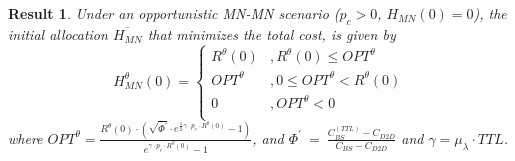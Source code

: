 \documentclass[10pt,conference,letterpaper]{IEEEtran}
\newtheorem{result}{Result}
\begin{document}
\begin{result}\label{THM:OPTIMAL-H0-MN-MN}
Under an \textit{opportunistic MN-MN scenario} ($p_{c}>0$, $H_{MN}(0)=0$), the initial allocation $\overline{H_{MN}}$ that minimizes the total cost, is given by
\begin{equation*}
 H_{MN}^{\theta}(0) = \left\{
 \begin{array}{lc}
  R^{\theta}(0)& ,  R^{\theta}(0)\leq  OPT^{\theta}\\
 OPT^{\theta} & , 0\leq OPT^{\theta}< R^{\theta}(0)\\
  0		& , OPT^{\theta}< 0\\
 \end{array}
 \right.
 \end{equation*}
where $\displaystyle{OPT^{\theta} =\frac{R^{\theta}(0)\cdot \left(\sqrt{\Phi^{'}}\cdot e^{\frac{1}{2}\gamma\cdot p_{c}\cdot R^{\theta}(0)}-1\right)}{e^{\gamma\cdot p_{c}\cdot R^{\theta}(0)}-1}}$, and $\Phi^{'}~=~\frac{C_{BS}^{(TTL)}-C_{D2D}}{C_{BS}-C_{D2D}}$ and $\gamma = \mu_{\lambda}\cdot TTL$.
\end{result}
\end{document}
